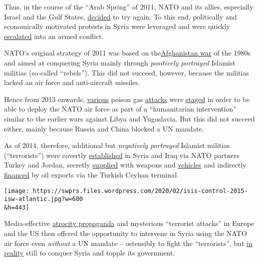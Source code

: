 Thus, in the course of the ``Arab Spring'' of 2011, NATO and its allies,
especially Israel and the Gulf States,
\href{https://www.globalresearch.ca/former-french-foreign-minister-the-war-against-syria-was-planned-two-years-before-the-arab-spring/5339112}{decided}
to try again. To this end, politically and economically motivated
protests in Syria were leveraged and were quickly
\href{https://www.globalresearch.ca/the-dirty-war-on-syria/5491859}{escalated}
into an armed conflict.

NATO's original strategy of 2011 was based on
the\href{https://en.wikipedia.org/wiki/Operation_Cyclone}{Afghanistan
war} of the 1980s and aimed at conquering Syria mainly through
\emph{positively portrayed} Islamist militias (so-called ``rebels'').
This did not succeed, however, because the militias lacked an air force
and anti-aircraft missiles.

Hence from 2013 onwards,
\href{https://www.theamericanconservative.com/articles/ex-weapons-inspector-trumps-sarin-claims-built-on-lie/}{various}
poison gas
\href{https://www.globalresearch.ca/the-bbc-saving-syrias-children-documentary-staged-events-fake-video-footage/5470158}{attacks}
were
\href{https://www.dailymail.co.uk/news/article-7793253/PETER-HITCHENS-reveals-evidence-watchdog-suppressed-report-casting-doubt-Assad-gas-attack.html}{staged}
in order to be able to deploy the NATO air force as part of a
``humanitarian intervention'' similar to the earlier wars against Libya
and Yugoslavia. But this did not succeed either, mainly because Russia
and China blocked a UN mandate.

As of 2014, therefore, additional but \emph{negatively portrayed}
Islamist militias (``terrorists'') were covertly
\href{https://www.globalresearch.ca/logistics-101-where-does-isis-get-its-guns/5454726}{established}
in Syria and Iraq via NATO partners Turkey and Jordan, secretly
\href{https://www.aljazeera.com/news/2017/12/isil-weapons-traced-saudi-arabia-171214164431586.html}{supplied}
with weapons and
\href{https://journal-neo.org/2015/10/09/the-mystery-of-isis-toyota-army-solved/}{vehicles}
and indirectly
\href{https://www.zerohedge.com/news/2015-11-27/how-turkey-exports-isis-oil-world-scientific-evidence}{financed}
by oil exports via the Turkish Ceyhan terminal.

\texttt{[image: https://swprs.files.wordpress.com/2020/02/isis-control-2015-isw-atlantic.jpg?w=600\\\&h=443]}

Media-effective
\href{https://www.telegraph.co.uk/journalists/bill-gardner/11054488/Foley-murder-video-may-have-been-staged.html}{atrocity
propaganda} and mysterious ``terrorist attacks'' in Europe and the US
then offered the opportunity to intervene in Syria using the NATO air
force even \emph{without} a UN mandate -- ostensibly to fight the
``terrorists'', but
\href{https://mondoweiss.net/2017/01/watched-manage-leaked/}{in reality}
still to conquer Syria and topple its government.

